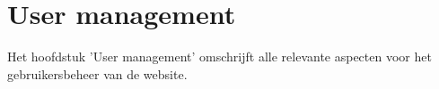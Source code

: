 
\section{User management}\label{usermanagement}

Het hoofdstuk 'User management' omschrijft alle relevante aspecten voor het gebruikersbeheer van de website.



